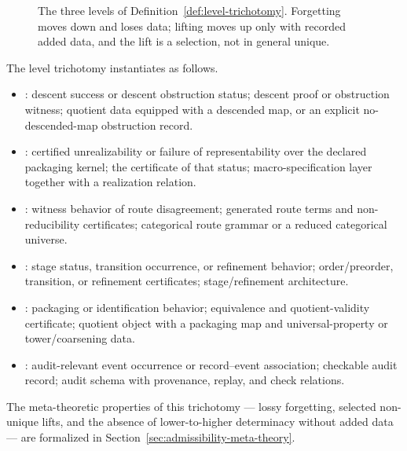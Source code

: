 \begin{figure}[htbp]
\centering
{}
\caption{The three levels of Definition~\ref{def:level-trichotomy}. Forgetting
moves down and loses data; lifting moves up only with recorded added data, and
the lift is a selection, not in general unique.}\label{fig:levels}
\end{figure}

\begin{remark}\label{rem:per-primitive-levels}
The level trichotomy instantiates as follows.
\begin{itemize}[topsep=2pt,itemsep=1pt]
  \item \Pone{}: descent success or descent obstruction status; descent
    proof or obstruction witness; quotient data equipped with a descended
    map, or an explicit no-descended-map obstruction record.
  \item \Ptwo{}: certified unrealizability or failure of representability
    over the declared packaging kernel; the certificate of that status;
    macro-specification layer together with a realization relation.
  \item \Pthree{}: witness behavior of route disagreement; generated route
    terms and non-reducibility certificates; categorical route grammar or a
    reduced categorical universe.
  \item \Pfour{}: stage status, transition occurrence, or refinement
    behavior; order/preorder, transition, or refinement certificates;
    stage/refinement architecture.
  \item \Pfive{}: packaging or identification behavior; equivalence and
    quotient-validity certificate; quotient object with a packaging map
    and universal-property or tower/coarsening data.
  \item \Psix{}: audit-relevant event occurrence or record--event
    association; checkable audit record; audit schema with provenance,
    replay, and check relations.
\end{itemize}
The meta-theoretic properties of this trichotomy --- lossy forgetting,
selected non-unique lifts, and the absence of lower-to-higher determinacy
without added data --- are formalized in
Section~\ref{sec:admissibility-meta-theory}.
\end{remark}

